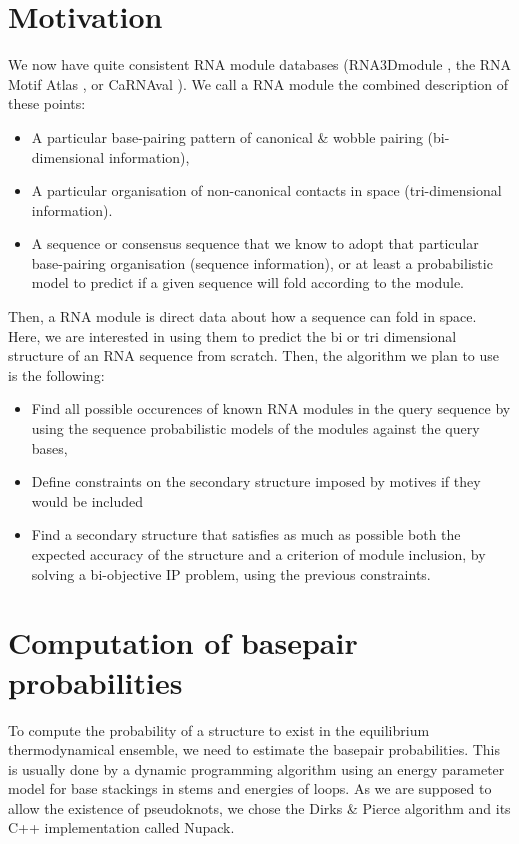 \documentclass{article}
\begin{document}
\section{Motivation}
We now have quite consistent RNA module databases (RNA3Dmodule \cite{djelloul_automated_2008}, the RNA Motif Atlas \cite{petrov_automated_2013}, or CaRNAval \cite{reinharz2018mining}). 
We call a RNA module the combined description of these points:
\begin{itemize}
\item A particular base-pairing pattern of canonical \& wobble pairing (bi-dimensional information),
	\item A particular organisation of non-canonical contacts in space (tri-dimensional information).
	\item A sequence or consensus sequence that we know to adopt that particular base-pairing organisation (sequence information), or at least a probabilistic model to predict if a given sequence will fold according to the module.
\end{itemize}
Then, a RNA module is direct data about how a sequence can fold in space. Here, we are interested in using them to predict the bi or tri dimensional structure of an RNA sequence from scratch. 
Then, the algorithm we plan to use is the following:

\begin{itemize}
	\item Find all possible occurences of known RNA modules in the query sequence by using the sequence probabilistic models of the modules against the query bases,
	\item Define constraints on the secondary structure imposed by motives if they would be included
	\item Find a secondary structure that satisfies as much as possible both the expected accuracy of the structure and a criterion of module inclusion, by solving a bi-objective IP problem, using the previous constraints.
\end{itemize}

\section{Computation of basepair probabilities}
To compute the probability of a structure to exist in the equilibrium thermodynamical ensemble, we need to estimate the basepair probabilities.
This is usually done by a dynamic programming algorithm using an energy parameter model for base stackings in stems and energies of loops.
As we are supposed to allow the existence of pseudoknots, we chose the Dirks \& Pierce algorithm \cite{dirksAlgorithmComputingNucleic2004} and its C++ implementation called Nupack.
\end{document}
